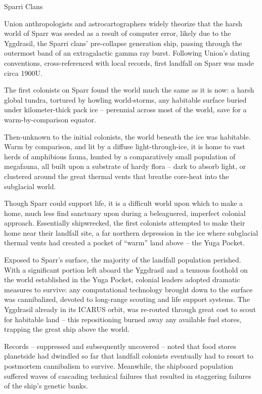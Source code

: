 Sparri Clans  

Union anthropologists and astrocartographers widely theorize that the harsh world of Sparr was  
seeded as a result of computer error, likely due to the Yggdrasil, the Sparri clans’ pre-collapse  
generation ship, passing through the outermost band of an extragalactic gamma ray burst.  
Following Union’s dating conventions, cross-referenced with local records, first landfall on Sparr  
was made circa 1900U.   

The first colonists on Sparr found the world much the same as it is now: a harsh global tundra,  
tortured by howling world-storms, any habitable surface buried under kilometer-thick pack ice --  
perennial across most of the world, save for a warm-by-comparison equator.   

Then-unknown to the initial colonists, the world beneath the ice was habitable. Warm by  
comparison, and lit by a diffuse light-through-ice, it is home to vast herds of amphibious fauna,  
hunted by a comparatively small population of megafauna, all built upon a substrate of hardy flora  
-- dark to absorb light, or clustered around the great thermal vents that breathe core-heat into the  
subglacial world.   

Though Sparr could support life, it is a difficult world upon which to make a home, much less find  
sanctuary upon during a beleaguered, imperfect colonial approach. Essentially shipwrecked, the  
first colonists attempted to make their home near their landfall site, a far northern depression in  
the ice where subglacial thermal vents had created a pocket of “warm” land above -- the Yuga  
Pocket.   

Exposed to Sparr’s surface, the majority of the landfall population perished. With a significant  
portion left aboard the Yggdrasil and a tenuous foothold on the world established in the Yuga  
Pocket, colonial leaders adopted dramatic measures to survive: any computational technology  
brought down to the surface was cannibalized, devoted to long-range scouting and life support  
systems. The Yggdrasil already in its ICARUS orbit, was re-routed through great cost to scout for  
habitable land -- this repositioning burned away any available fuel stores, trapping the great ship  
above the world.   

Records -- suppressed and subsequently uncovered -- noted that food stores planetside had  
dwindled so far that landfall colonists eventually had to resort to postmortem cannibalism to  
survive. Meanwhile, the shipboard population suffered waves of cascading technical failures that  
resulted in staggering failures of the ship’s genetic banks.  

